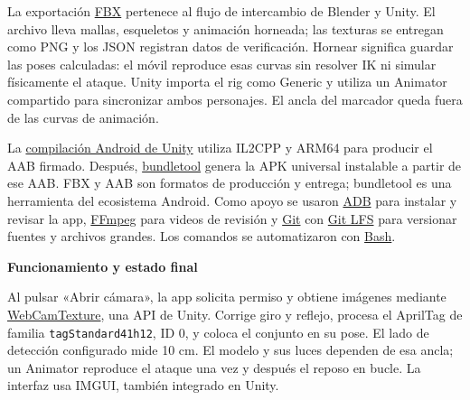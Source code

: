 \documentclass[11pt,letterpaper]{article}
\newcommand{\heading}[1]{\par{\sffamily\bfseries\fontsize{18}{22}\selectfont\color{ink}#1}\par\vspace{5pt}}
\begin{document}
\begin{center}
\end{center}

La exportación \href{https://docs.blender.org/manual/en/4.5/addons/import_export/scene_fbx.html}{FBX} pertenece al flujo de intercambio de Blender y Unity. El archivo lleva mallas, esqueletos y animación horneada; las texturas se entregan como PNG y los JSON registran datos de verificación. Hornear significa guardar las poses calculadas: el móvil reproduce esas curvas sin resolver IK ni simular físicamente el ataque. Unity importa el rig como Generic y utiliza un Animator compartido para sincronizar ambos personajes. El ancla del marcador queda fuera de las curvas de animación.

La \href{https://docs.unity3d.com/6000.3/Documentation/Manual/android-BuildProcess.html}{compilación Android de Unity} utiliza IL2CPP y ARM64 para producir el AAB firmado. Después, \href{https://developer.android.com/tools/bundletool}{bundletool} genera la APK universal instalable a partir de ese AAB. FBX y AAB son formatos de producción y entrega; bundletool es una herramienta del ecosistema Android. Como apoyo se usaron \href{https://developer.android.com/tools/adb}{ADB} para instalar y revisar la app, \href{https://ffmpeg.org/}{FFmpeg} para videos de revisión y \href{https://git-scm.com/}{Git} con \href{https://git-lfs.com/}{Git LFS} para versionar fuentes y archivos grandes. Los comandos se automatizaron con \href{https://www.gnu.org/software/bash/}{Bash}.

\newpage
\heading{Funcionamiento y estado final}

Al pulsar «Abrir cámara», la app solicita permiso y obtiene imágenes mediante \href{https://docs.unity3d.com/6000.3/Documentation/ScriptReference/WebCamTexture.html}{WebCamTexture}, una API de Unity. Corrige giro y reflejo, procesa el AprilTag de familia \texttt{tagStandard41h12}, ID 0, y coloca el conjunto en su pose. El lado de detección configurado mide 10 cm. El modelo y sus luces dependen de esa ancla; un Animator reproduce el ataque una vez y después el reposo en bucle. La interfaz usa IMGUI, también integrado en Unity.
\end{document}
